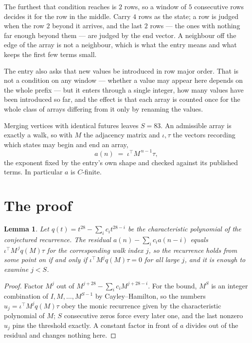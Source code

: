 \documentclass[11pt,a4paper]{article}
\theoremstyle{plain}
\newtheorem{lemma}[theorem]{Lemma}
\theoremstyle{definition}
\begin{document}
The furthest that condition reaches is $2$ rows, so a window of $5$ consecutive rows decides it for the row in the middle. Carry $4$ rows as the state; a row is judged when the row $2$ beyond it arrives, and the last $2$ rows --- the ones with nothing far enough beyond them --- are judged by the end vector. A neighbour off the edge of the array is not a neighbour, which is what the entry means and what keeps the first few terms small.

The entry also asks that new values be introduced in row major order. That is not a condition on any window --- whether a value may appear here depends on the whole prefix --- but it enters through a single integer, how many values have been introduced so far, and the effect is that each array is counted once for the whole class of arrays differing from it only by renaming the values.

Merging vertices with identical futures leaves $S=83$. An admissible array is exactly a walk, so with $M$ the adjacency matrix and $\iota,\tau$ the vectors recording which states may begin and end an array,
\[
a(n)\;=\;\iota^{\!\top}M^{\,n-1}\tau ,
\]
the exponent fixed by the entry's own shape and checked against its published terms. In
particular $a$ is $C$-finite.

\section{The proof}

\begin{lemma}\label{lem:crit}
Let $q(t)=t^{28}-\sum_i c_it^{28-i}$ be the characteristic polynomial of the
conjectured recurrence. The residual $a(n)-\sum_ic_ia(n-i)$ equals
$\iota^{\!\top}M^{\,j}q(M)\tau$ for the corresponding walk index $j$, so the recurrence
holds from some point on if and only if $\iota^{\!\top}M^{j}q(M)\tau=0$ for all large $j$,
and it is enough to examine $j<S$.
\end{lemma}

\begin{proof}
Factor $M^{j}$ out of $M^{j+28}-\sum_ic_iM^{j+28-i}$. For the bound, $M^{S}$
is an integer combination of $I,M,\dots,M^{S-1}$ by Cayley--Hamilton, so the numbers
$u_j=\iota^{\!\top}M^{j}q(M)\tau$ obey the monic recurrence given by the characteristic
polynomial of $M$; $S$ consecutive zeros force every later one, and the last nonzero $u_j$
pins the threshold exactly. A constant factor in front of $a$ divides out of the residual and
changes nothing here.
\end{proof}
\end{document}
